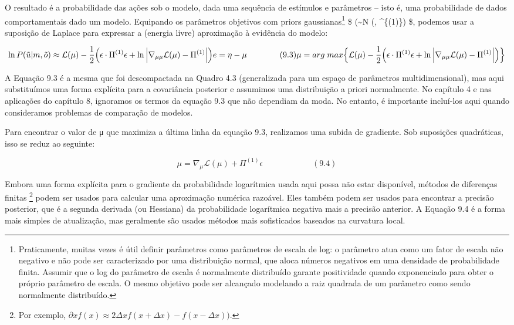 \documentclass[
  12pt,
]{book}
\begin{document}
O resultado é a probabilidade das ações sob o modelo, dada uma sequência de estímulos e parâmetros -- isto é, uma probabilidade de dados comportamentais dado um modelo. Equipando os parâmetros objetivos com priors gaussianas\footnote{Praticamente, muitas vezes é útil definir parâmetros como parâmetros de escala de log: o parâmetro atua como um fator de escala não negativo e não pode ser caracterizado por uma distribuição normal, que aloca números negativos em uma densidade de probabilidade finita. Assumir que o log do parâmetro de escala é normalmente distribuído garante positividade quando exponenciado para obter o próprio parâmetro de escala. O mesmo objetivo pode ser alcançado modelando a raiz quadrada de um parâmetro como sendo normalmente distribuído.} \$ (\theta \sim \mathcal N (\eta, \Pi\^{}\{(1)\}) \$, podemos usar a suposição de Laplace para expressar a (energia livre) aproximação à evidência do modelo:

\[\begin{equation}
\ln P(\tilde u| m, \tilde o) \approx \mathcal L(\mu)- \frac{1}{2} \Big(\epsilon \cdot \Pi^{(1)}\epsilon + \ln \Big| \nabla_{\mu\mu} \mathcal L (\mu)-\Pi^{(1)} \Big| \Big) \\ 
e = \eta - \mu  \qquad \qquad (9.3)\\
\mu = arg \; max \Big\{ \mathcal L(\mu)- \frac{1}{2} \Big(\epsilon \cdot \Pi^{(1)}\epsilon + \ln \Big| \nabla_{\mu\mu} \mathcal L (\mu)-\Pi^{(1)} \Big| \Big)  \Big\}
\end{equation}\]

A Equação 9.3 é a mesma que foi descompactada na Quadro 4.3 (generalizada para um espaço de parâmetros multidimensional), mas aqui substituímos uma forma explícita para a covariância posterior e assumimos uma distribuição a priori normalmente. No capítulo 4 e nas aplicações do capítulo 8, ignoramos os termos da equação 9.3 que não dependiam da moda. No entanto, é importante incluí-los aqui quando consideramos problemas de comparação de modelos.

Para encontrar o valor de μ que maximiza a última linha da equação 9.3, realizamos uma subida de gradiente. Sob suposições quadráticas, isso se reduz ao seguinte:

\[ \mu = \nabla_\mu \mathcal L(\mu) + \Pi^{(1)}\epsilon \qquad\qquad\qquad (9.4) \]

Embora uma forma explícita para o gradiente da probabilidade logarítmica usada aqui possa não estar disponível, métodos de diferenças finitas \footnote{Por exemplo, \(∂x f(x) ≈ 2Δx f(x + Δx) − f(x − Δx)).\)} podem ser usados para calcular uma aproximação numérica razoável. Eles também podem ser usados para encontrar a precisão posterior, que é a segunda derivada (ou Hessiana) da probabilidade logarítmica negativa mais a precisão anterior. A Equação 9.4 é a forma mais simples de atualização, mas geralmente são usados métodos mais sofisticados baseados na curvatura local.
\end{document}
